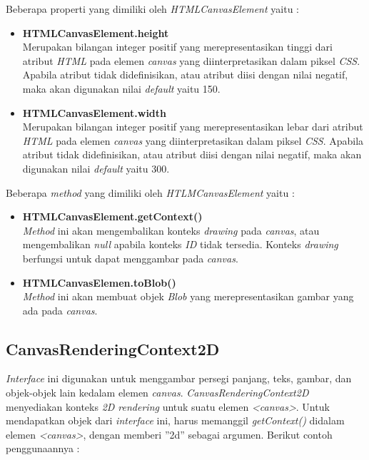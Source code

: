 Beberapa properti yang dimiliki oleh \textit{HTMLCanvasElement} yaitu : 

\begin{itemize}
	\item \textbf{HTMLCanvasElement.height} \\ Merupakan bilangan integer positif yang merepresentasikan tinggi dari atribut \textit{HTML} pada elemen \textit{canvas} yang diinterpretasikan dalam piksel \textit{CSS}. Apabila atribut tidak didefinisikan, atau atribut diisi dengan nilai negatif, maka akan digunakan nilai \textit{default} yaitu 150.
	\item \textbf{HTMLCanvasElement.width} \\ Merupakan bilangan integer positif yang merepresentasikan lebar dari atribut \textit{HTML} pada elemen \textit{canvas} yang diinterpretasikan dalam piksel \textit{CSS}. Apabila atribut tidak didefinisikan, atau atribut diisi dengan nilai negatif, maka akan digunakan nilai \textit{default} yaitu 300.
\end{itemize}

Beberapa \textit{method} yang dimiliki oleh \textit{HTLMCanvasElement} yaitu : 

\begin{itemize}
	\item \textbf{HTMLCanvasElement.getContext()} \\ \textit{Method} ini akan mengembalikan konteks \textit{drawing} pada \textit{canvas}, atau mengembalikan \textit{null} apabila konteks \textit{ID} tidak tersedia. Konteks \textit{drawing} berfungsi untuk dapat menggambar pada \textit{canvas}.
	\item \textbf{HTMLCanvasElemen.toBlob()} \\ \textit{Method} ini akan membuat objek \textit{Blob} yang merepresentasikan gambar yang ada pada \textit{canvas}. 
	
\end{itemize}


\subsection{CanvasRenderingContext2D}
\textit{Interface} ini digunakan untuk menggambar persegi panjang, teks, gambar, dan objek-objek lain kedalam elemen \textit{canvas}. \textit{CanvasRenderingContext2D} menyediakan konteks \textit{2D rendering} untuk suatu elemen \textit{<canvas>}.
Untuk mendapatkan objek dari \textit{interface} ini, harus memanggil \textit{getContext()} didalam elemen \textit{<canvas>}, dengan memberi ''2d'' sebagai argumen. Berikut contoh penggunaannya :

